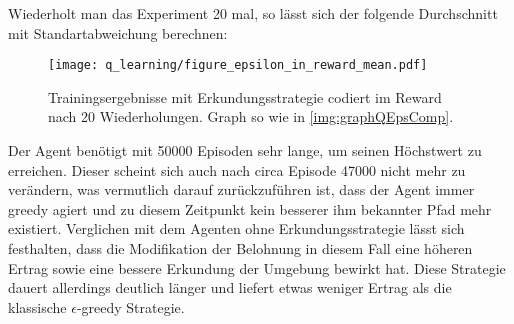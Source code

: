 Wiederholt man das Experiment 20 mal, so lässt sich der folgende Durchschnitt mit Standartabweichung berechnen:
\begin{figure}[H]
    \centering
    \texttt{[image: q\_learning/figure\_epsilon\_in\_reward\_mean.pdf]}
    \caption{Trainingsergebnisse mit Erkundungsstrategie codiert im Reward nach 20 Wiederholungen. Graph so wie in \ref{img:graphQEpsComp}.} \label{img:graphQEpsInRewMean}
\end{figure}
Der Agent benötigt mit 50000 Episoden sehr lange, um seinen Höchstwert zu erreichen. Dieser scheint sich auch nach circa Episode 47000 nicht mehr zu verändern, was vermutlich darauf zurückzuführen ist, dass der Agent immer greedy agiert und zu diesem Zeitpunkt kein besserer ihm bekannter Pfad mehr existiert. Verglichen mit dem Agenten ohne Erkundungsstrategie lässt sich festhalten, dass die Modifikation der Belohnung in diesem Fall eine höheren Ertrag sowie eine bessere Erkundung der Umgebung bewirkt hat. Diese Strategie dauert allerdings deutlich länger und liefert etwas weniger Ertrag als die klassische $ \epsilon $-greedy Strategie.








